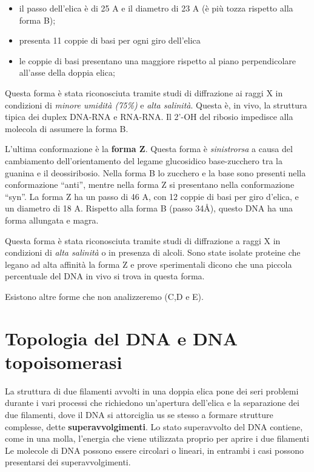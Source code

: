 \documentclass[11pt]{book}
\begin{document}
\begin{itemize}
\itemsep1pt\parskip0pt
\item
  il passo dell'elica è di 25 A e il diametro di 23 A (è più tozza
  rispetto alla forma B);
\item
  presenta 11 coppie di basi per ogni giro dell'elica
\item
  le coppie di basi presentano una maggiore rispetto al piano
  perpendicolare all'asse della doppia elica;
\end{itemize}

Questa forma è stata riconosciuta tramite studi di diffrazione ai raggi
X in condizioni di \emph{minore umidità (75\%)} e \emph{alta salinità}.
Questa è, in vivo, la struttura tipica dei duplex DNA-RNA e RNA-RNA. Il
2'-OH del ribosio impedisce alla molecola di assumere la forma B.

L'ultima conformazione è la \textbf{forma Z}. Questa forma è
\emph{sinistrorsa} a causa del cambiamento dell'orientamento del legame
glucosidico base-zucchero tra la guanina e il deossiribosio. Nella forma
B lo zucchero e la base sono presenti nella conformazione ``anti'',
mentre nella forma Z si presentano nella conformazione ``syn''. La forma
Z ha un passo di 46 A, con 12 coppie di basi per giro d'elica, e un
diametro di 18 A. Rispetto alla forma B (passo 34Å), questo DNA ha una
forma allungata e magra.

Questa forma è stata riconosciuta tramite studi di diffrazione a raggi X
in condizioni di \emph{alta salinità} o in presenza di alcoli. Sono
state isolate proteine che legano ad alta affinità la forma Z e prove
sperimentali dicono che una piccola percentuale del DNA in vivo si trova
in questa forma.

Esistono altre forme che non analizzeremo (C,D e E).

\section{Topologia del DNA e DNA
topoisomerasi}\label{topologia-del-dna-e-dna-topoisomerasi}

La struttura di due filamenti avvolti in una doppia elica pone dei seri
problemi durante i vari processi che richiedono un'apertura dell'elica e
la separazione dei due filamenti, dove il DNA si attorciglia us se
stesso a formare strutture complesse, dette \textbf{superavvolgimenti}.
Lo stato superavvolto del DNA contiene, come in una molla, l'energia che
viene utilizzata proprio per aprire i due filamenti Le molecole di DNA
possono essere circolari o lineari, in entrambi i casi possono
presentarsi dei superavvolgimenti.
\end{document}
